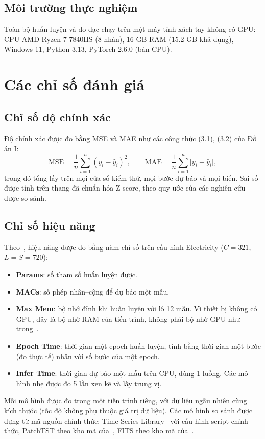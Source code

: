 \documentclass[12pt,a4paper]{report}
\numberwithin{equation}{chapter}
\begin{document}
\subsection{Môi trường thực nghiệm}

Toàn bộ huấn luyện và đo đạc chạy trên một máy tính xách tay không có GPU: CPU AMD Ryzen 7 7840HS (8 nhân), 16 GB RAM (15.2 GB khả dụng),
Windows 11, Python 3.13, PyTorch 2.6.0 (bản CPU).

\section{Các chỉ số đánh giá}

\subsection{Chỉ số độ chính xác}

Độ chính xác được đo bằng MSE và MAE như các công thức (3.1), (3.2) của Đồ án I:
\begin{equation}
\text{MSE}=\frac{1}{n}\sum_{i=1}^{n}(y_i-\hat{y}_i)^2,\qquad
\text{MAE}=\frac{1}{n}\sum_{i=1}^{n}\lvert y_i-\hat{y}_i\rvert ,
\label{eq:metrics}
\end{equation}
trong đó tổng lấy trên mọi cửa sổ kiểm thử, mọi bước dự báo và mọi biến. Sai số được tính trên thang đã chuẩn hóa
Z-score, theo quy ước của các nghiên cứu được so sánh.

\subsection{Chỉ số hiệu năng}

Theo~\cite{timebase}, hiệu năng được đo bằng năm chỉ số trên cấu hình Electricity ($C=321$, $L=S=720$):
\begin{itemize}
  \item \textbf{Params}: số tham số huấn luyện được.
  \item \textbf{MACs}: số phép nhân--cộng để dự báo một mẫu.
  \item \textbf{Max Mem}: bộ nhớ đỉnh khi huấn luyện với lô 12 mẫu. Vì thiết bị không có GPU, đây là bộ nhớ RAM của
        tiến trình, không phải bộ nhớ GPU như trong~\cite{timebase}.
  \item \textbf{Epoch Time}: thời gian một epoch huấn luyện, tính bằng thời gian một bước (đo thực tế) nhân với số bước của
        một epoch.
  \item \textbf{Infer Time}: thời gian dự báo một mẫu trên CPU, dùng 1 luồng. Các mô hình nhẹ được đo 5 lần xen kẽ và lấy
        trung vị.
\end{itemize}
Mỗi mô hình được đo trong một tiến trình riêng, với dữ liệu ngẫu nhiên cùng kích thước (tốc độ không phụ thuộc giá
trị dữ liệu). Các mô hình so sánh được dựng từ mã nguồn chính thức: Time-Series-Library~\cite{tslib} với cấu hình script
chính thức, PatchTST theo kho mã của~\cite{patchtst}, FITS theo kho mã của~\cite{fits}.
\end{document}
